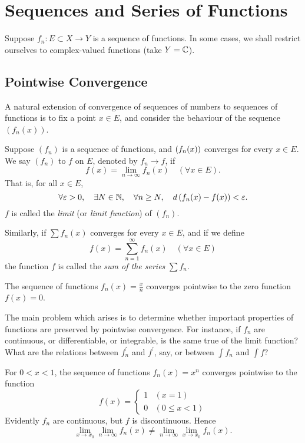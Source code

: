 \chapter{Sequences and Series of Functions}\label{chap:func-seq-series}
Suppose $f_n:E\subset X\to Y$ is a sequence of functions. In some cases, we shall restrict ourselves to complex-valued functions (take $Y=\mathbb C$).

\section{Pointwise Convergence}
A natural extension of convergence of sequences of numbers to sequences of functions is to fix a point $x\in E$, and consider the behaviour of the sequence $(f_n(x))$.

\begin{definition}
Suppose $(f_n)$ is a sequence of functions, and $\left(f_n(x)\right)$ converges for every $x\in E$. We say $(f_n)$  to $f$ on $E$, denoted by $f_n\to f$, if
\[f(x)=\lim_{n\to\infty}f_n(x)\quad(\forall x\in E).\]
That is, for all $x\in E$,
\[\forall\varepsilon>0,\quad\exists N\in\mathbb N,\quad\forall n\ge N,\quad d\left(f_n(x)-f(x)\right)<\varepsilon.\]
$f$ is called the \emph{limit} (or \emph{limit function}) of $(f_n)$.
\end{definition}

Similarly, if $\sum f_n(x)$ converges for every $x\in E$, and if we define
\[f(x)=\sum_{n=1}^\infty f_n(x)\quad(\forall x\in E)\]
the function $f$ is called the \emph{sum of the series} $\sum f_n$.

\begin{example}
The sequence of functions $f_n(x)=\frac{x}{n}$ converges pointwise to the zero function $f(x)=0$.
\end{example}

The main problem which arises is to determine whether important properties of functions are preserved by pointwise convergence. For instance, if $f_n$ are continuous, or differentiable, or integrable, is the same true of the limit function? What are the relations between $f_n^\prime$ and $f^\prime$, say, or between $\int f_n$ and $\int f$? 

\begin{example}[Continuity]
For $0<x<1$, the sequence of functions $f_n(x)=x^n$ converges pointwise to the function 
\[f(x)=\begin{cases}
1&(x=1)\\
0&(0\le x<1)
\end{cases}\]
Evidently $f_n$ are continuous, but $f$ is discontinuous. Hence
\[\lim_{x\to x_0}\lim_{n\to\infty}f_n(x)\neq\lim_{n\to\infty}\lim_{x\to x_0}f_n(x).\]
\end{example}

